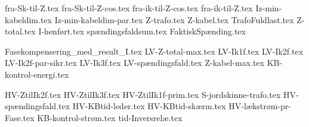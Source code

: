 \usepackage[utf8]{inputenc}%
\usepackage{amsmath}%
\usepackage{mathtools}%
\usepackage{icomma}%
\usepackage{siunitx}%
\usepackage{fp}%
\usepackage{xstring}%
\usepackage{listofitems}
\usepackage{ifthen}
\usepackage{gensymb} %

{fra-Sk-til-Z.tex}
{fra-Sk-til-Z-cos.tex}
{fra-ik-til-Z-cos.tex}
{fra-ik-til-Z.tex}
{Iz-min-kabeldim.tex}
{Iz-min-kabeldim-par.tex}
{Z-trafo.tex}
{Z-kabel.tex}
{TrafoFuldlast.tex}
{Z-total.tex}
{I-henført.tex}
{spændingsfaldsum.tex}
{FaktiskSpænding.tex}

{Fasekompensering_med_result_I.tex}
{LV-Z-total-max.tex}
{LV-Ik1f.tex}
{LV-Ik2f.tex}
{LV-Ik2f-par-sikr.tex}
{LV-Ik3f.tex}
{LV-spændingsfald.tex}
{Z-kabel-max.tex}
{KB-kontrol-energi.tex}

{HV-ZtilIk2f.tex}
{HV-ZtilIk3f.tex}
{HV-ZtilIk1f-prim.tex}
{S-jordskinne-trafo.tex}
{HV-spændingsfald.tex}
{HV-KBtid-leder.tex}
{HV-KBtid-skærm.tex}
{HV-lækstrøm-pr-Fase.tex}
{KB-kontrol-strøm.tex}
{tid-Inversrelæ.tex}